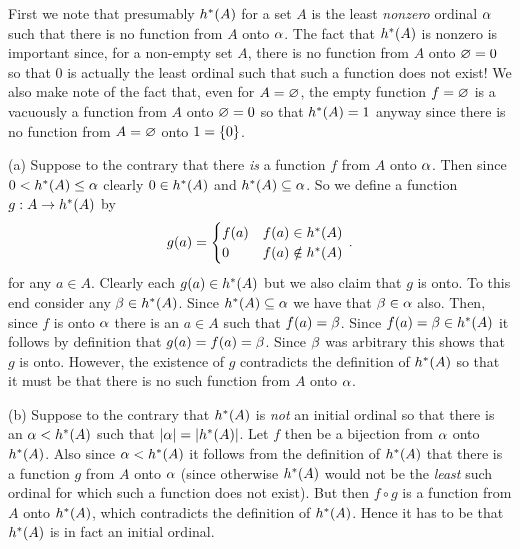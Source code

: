 \begin{solution}
    \mainprob

    First we note that presumably $h^*(A)$ for a set $A$ is the least \emph{nonzero} ordinal $\alpha$ such that there is no function from $A$ onto $\alpha$.
    The fact that $h^*(A)$ is nonzero is important since, for a non-empty set $A$, there is no function from $A$ onto $\varnothing = 0$ so that $0$ is actually the least ordinal such that such a function does not exist!
    We also make note of the fact that, even for $A=\varnothing$, the empty function $f = \varnothing$ is a vacuously a function from $A$ onto $\varnothing = 0$ so that $h^*(A) = 1$ anyway since there is no function from $A = \varnothing$ onto $1 = \left\{ 0 \right\}$.

	(a) Suppose to the contrary that there \emph{is} a function $f$ from $A$ onto $\alpha$.
    Then since $0 < h^*(A) \leq \alpha$ clearly $0 \in h^*(A)$ and $h^*(A) \subseteq \alpha$.
    So we define a function $g : A \to h^*(A)$ by
    $$
    g(a) = \begin{cases}
         f(a) & f(a) \in h^*(A) \\
         0 & f(a) \notin h^*(A)
    \end{cases} \,.
    $$
    for any $a \in A$.
    Clearly each $g(a) \in h^*(A)$ but we also claim that $g$ is onto.
    To this end consider any $\beta \in h^*(A)$.
    Since $h^*(A) \subseteq \alpha$ we have that $\beta \in \alpha$ also.
    Then, since $f$ is onto $\alpha$ there is an $a \in A$ such that $f(a) = \beta$.
    Since $f(a) = \beta \in h^*(A)$ it follows by definition that $g(a) = f(a) = \beta$.
    Since $\beta$ was arbitrary this shows that $g$ is onto.
    However, the existence of $g$  contradicts the definition of $h^*(A)$ so that it must be that there is no such function from $A$ onto $\alpha$. \qedsymbol

    (b) Suppose to the contrary that $h^*(A)$ is \emph{not} an initial ordinal so that there is an $\alpha < h^*(A)$ such that $\left| \alpha \right| = \left| h^*(A) \right|$.
    Let $f$ then be a bijection from $\alpha$ onto $h^*(A)$.
    Also since $\alpha < h^*(A)$ it follows from the definition of $h^*(A)$ that there is a function $g$ from $A$ onto $\alpha$ (since otherwise $h^*(A)$ would not be the \emph{least} such ordinal for which such a function does not exist).
    But then $f \circ g$ is a function from $A$ onto $h^*(A)$, which contradicts the definition of $h^*(A)$.
    Hence it has to be that $h^*(A)$ is in fact an initial ordinal.


\end{solution}
